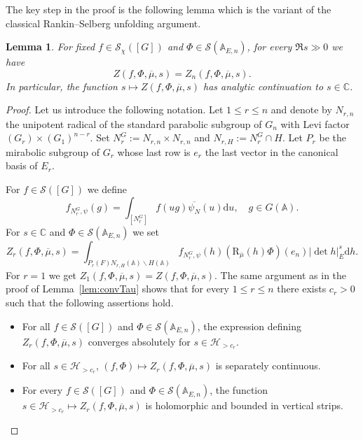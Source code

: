 \documentclass[letterpaper,11pt]{amsart}
\newcommand{\bA}{\mathbb{A}}
\newcommand{\C}{\mathbb{C}}
\newcommand{\cS}{\mathcal{S}}
\newcommand{\rd}{\mathrm{d}}
\newcommand{\<}{\negthickspace}
\theoremstyle{definition}
\theoremstyle{plain}
\newtheorem{lemma}[definition]{Lemma}
\theoremstyle{remark}
\numberwithin{equation}{section}
\begin{document}
The key step in the proof is the following lemma which is the variant of the classical Rankin--Selberg unfolding argument.

\begin{lemma}
    \label{lem:RS_Schwartz}
    For fixed $f \in \cS_{\chi}([G])$ and $\Phi \in \cS(\bA_{E, n})$, for every $\Re s\gg0$ we have
    \begin{equation}   
        \label{eq:RS_equality_Schwartz}
        Z(f, \Phi, \overline{\mu}, s)=Z_n(f, \Phi,\overline{\mu}, s).
        \end{equation} 
    In particular, the function $s \mapsto Z(f,
    \Phi, \overline{\mu}, s)$ has analytic continuation to $s \in \C$.
\end{lemma}

\begin{proof}
    Let us introduce the following notation. Let $1 \leq r \leq n$ and denote by
$N_{r,n}$ the unipotent radical of the standard parabolic subgroup of $G_n$
with Levi factor $(G_r) \times (G_1)^{n-r}$. Set $N_r^G:=N_{r,n} \times
N_{r,n}$ and $N_{r,H} := N_r^G \cap H$. Let $P_r$ be the mirabolic subgroup of
$G_r$ whose last row is $e_r$ the last vector in the canonical basis of $E_r$.

For $f \in \cS([G])$ we define
    \[
    f_{N_r^G, \psi}(g) =
    \int_{[N_r^G]} f(ug) \overline{\psi_N}(u) \rd u,\quad g \in G(\bA).
    \]
For $s \in \C$ and $\Phi \in \cS(\bA_{E,n})$ we set
    \begin{equation*}
    Z_{r}(f,\Phi, \overline{\mu}, s) =
    \int_{P_r(F) N_{r,H}(\bA) \backslash H(\bA)}
    f_{N_r^G, \psi}(h) (\mathrm{R}_{\overline{\mu}}(h)\Phi)(e_n) |\det h|_E^{s}
    \rd h.
    \end{equation*}
For $r=1$ we get $Z_{1}(f,\Phi, \overline{\mu}, s)=Z(f,
\Phi, \overline{\mu}, s)$. The same argument as in the proof of Lemma~\ref{lem:convTau}
shows that for every $1 \leq r \leq n$ there exists $c_r>0$ such that the
following assertions hold.
\begin{itemize}
    \item For all $f \in \cS([G])$ and $\Phi \in \cS(\bA_{E,n})$, the
        expression defining $Z_{r}(f,\Phi,\overline{\mu},s)$ converges
        absolutely for $s \in \mathcal{H}_{>c_r}$.

    \item For all $s \in \mathcal{H}_{>c_r}$, $(f, \Phi) \mapsto
        Z_{r}(f,\Phi,\overline{\mu},s)$ is separately continuous.

    \item For every $f \in \cS([G])$ and $\Phi \in \cS(\bA_{E,n})$, the
        function $s \in \mathcal{H}_{>c_r} \mapsto
        Z_{r}(f,\Phi,\overline{\mu},s)$ is holomorphic and bounded in
        vertical strips.
\end{itemize}


\end{proof}
\end{document}

